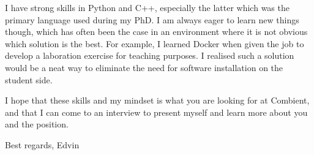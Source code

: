 \documentclass[11pt, a4paper]{../awesome-cv} %
\begin{document}
\begin{cvletter}
I have strong skills in Python and C++, especially the latter which was the primary language used during my PhD.
I am always eager to learn new things though, which has often been the case in an environment where it is not obvious which solution is the best.
For example, I learned Docker when given the job to develop a laboration exercise for teaching purposes. 
I realised such a solution would be a neat way to eliminate the need for software installation on the student side.

I hope that these skills and my mindset is what you are looking for at Combient, and that I can come to an interview to present myself and learn more about you and the position.

Best regards,
Edvin


\end{cvletter}


\makeletterclosing %
\end{document}
